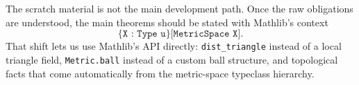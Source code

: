 \begin{remark*}
The scratch material is not the main development path. Once the raw obligations
are understood, the main theorems should be stated with Mathlib's context
\[
  \texttt{\{X : Type u\} [MetricSpace X]}.
\]
That shift lets us use Mathlib's API directly: \texttt{dist\_triangle} instead
of a local triangle field, \texttt{Metric.ball} instead of a custom ball
structure, and topological facts that come automatically from the metric-space
typeclass hierarchy.
\end{remark*}
